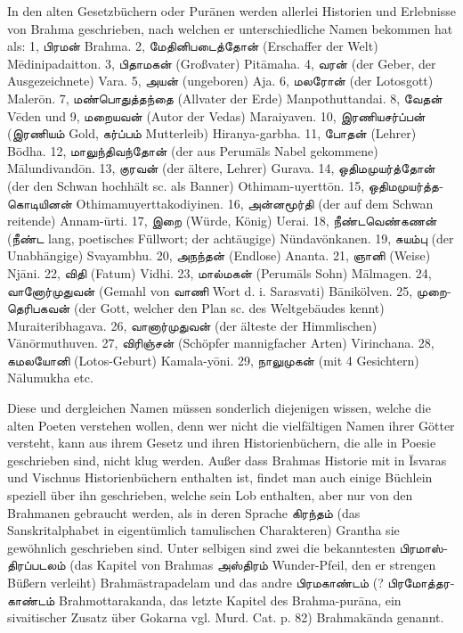 \documentclass{article}
\newcommand{\TamilText}[1]{\texttamil{#1}}
\newcommand{\tam}[1]{\TamilText{#1}}
\begin{document}
In den alten Gesetzbüchern oder Pur\={a}nen werden allerlei Historien und Erlebnisse von Brahma geschrieben, nach welchen er unterschiedliche Namen bekommen hat als: 1, \tam{பிரமன்} Brahma. 2, \tam{மேதினிபடைத்தோன்} (Erschaffer der Welt) M\={e}dinipadaitton. 3, \tam{பிதாமகன்} (Großvater) Pit\={a}maha. 4, \tam{வரன்} (der Geber, der Ausgezeichnete) Vara. 5, \tam{அயன்} (ungeboren) Aja. 6, \tam{மலரோன்} (der Lotosgott) Maler\={o}n. 7, \tam{மண்பொதுத்தந்தை} (Allvater der Erde) Manpothuttandai. 8, \tam{வேதன்} V\={e}den und 9, \tam{மறையவன்} (Autor der Vedas) Maraiyaven. 10, \tam{இரணியசர்ப்பன்} (\tam{இரணியம்} Gold, \tam{கர்ப்பம்} Mutterleib) Hiranya-garbha. 11, \tam{போதன்} (Lehrer) B\={o}dha. 12, \tam{மாலுந்திவந்தோன்} (der aus Perum\={a}ls Nabel gekommene) M\={a}lundivand\={o}n. 13, \tam{குரவன்} (der ältere, Lehrer) Gurava. 14, \tam{ஒதிமமுயர்த்தோன்} (der den Schwan hochhält sc. als Banner) Othimam-uyertt\={o}n. 15, \tam{ஒதிமமுயர்த்தகொடியினன்} Othimamuyerttakodiyinen. 16, \tam{அன்னமூர்தி} (der auf dem Schwan reitende) Annam-\={u}rti. 17, \tam{இறை} (Würde, König) Uerai. 18, \tam{நீண்டவெண்கணன்} (\tam{நீண்ட} lang, poetisches Füllwort; der achtäugige) Nündavönkanen. 19, \tam{சுயம்பு} (der Unabhängige) Svayambhu. 20, \tam{அநந்தன்} (Endlose) Ananta. 21, \tam{ஞானி} (Weise) Nj\={a}ni. 22, \tam{விதி} (Fatum) Vidhi. 23, \tam{மால்மகன்} (Perum\={a}ls Sohn) M\={a}lmagen. 24, \tam{வானோர்முதுவன்} (Gemahl von \tam{வாணி} Wort d. i. Sarasvati) B\={a}nikölven. 25, \tam{முறைதெரிபகவன்} (der Gott, welcher den Plan sc. des Weltgebäudes kennt) Muraiteribhagava. 26, \tam{வானார்முதுவன்} (der älteste der Himmlischen) V\={a}n\={o}rmuthuven. 27, \tam{விரிஞ்சன்} (Schöpfer mannigfacher Arten) Virinchana. 28, \tam{கமலயோனி} (Lotos-Geburt) Kamala-y\={o}ni. 29, \tam{நாலுமுகன்} (mit 4 Gesichtern) N\={a}lumukha etc.

Diese und dergleichen Namen müssen sonderlich diejenigen wissen, welche die alten Poeten verstehen wollen, denn wer nicht die vielfältigen Namen ihrer Götter versteht, kann aus ihrem Gesetz und ihren Historienbüchern, die alle in Poesie geschrieben sind, nicht klug werden. Außer dass Brahmas Historie mit in \={I}svaras und Vischnus Historienbüchern enthalten ist, findet man auch einige Büchlein speziell über ihn geschrieben, welche sein Lob enthalten, aber nur von den Brahmanen gebraucht werden, als in deren Sprache \tam{கிரந்தம்} (das Sanskritalphabet in eigentümlich tamulischen Charakteren) Grantha sie gewöhnlich geschrieben sind. Unter selbigen sind zwei die bekanntesten \tam{பிரமாஸ்திரப்படலம்} (das Kapitel von Brahmas \tam{அஸ்திரம்} Wunder-Pfeil, den er strengen Büßern verleiht) Brahm\={a}strapadelam und das andre \tam{பிரமகாண்டம்} (? \tam{பிரமோத்தரகாண்டம்} Brahmottarakanda, das letzte Kapitel des Brahma-pur\={a}na, ein sivaitischer Zusatz über Gokarna vgl. Murd. Cat. p. 82) Brahmak\={a}nda genannt.
\end{document}
